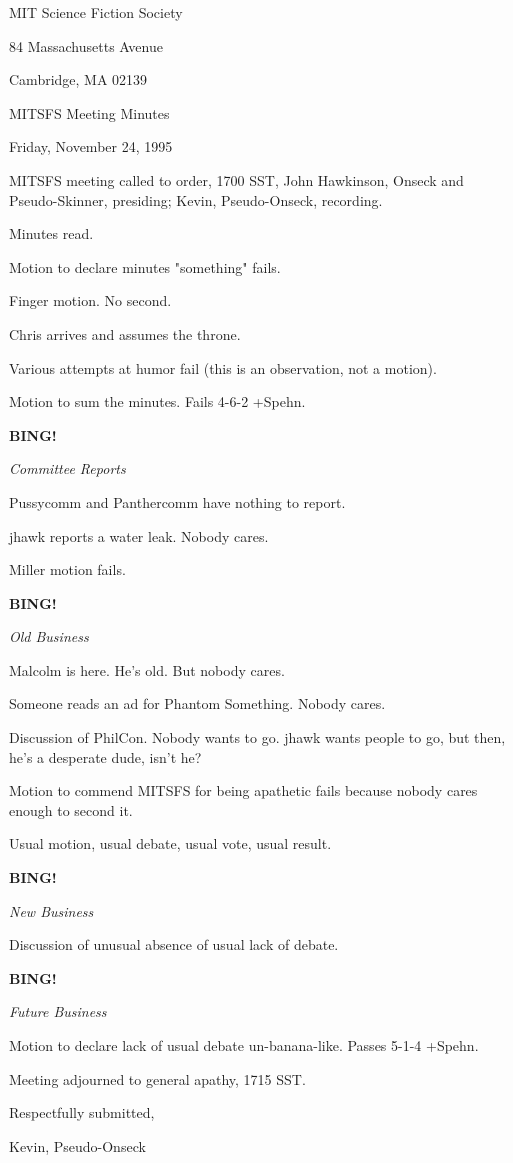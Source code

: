 \documentclass[12pt]{article}
\newcommand{\bing}{{\bf BING!} }
\newcommand{\goto}[1]{\bing \vskip 12pt \centerline{{\em{#1}}}}
\begin{document}
\begin{center}

MIT Science Fiction Society 

84 Massachusetts Avenue

Cambridge, MA 02139

\vspace{12pt}

MITSFS Meeting Minutes 

Friday, November 24, 1995

\end{center}
 
\vspace{18pt}

\setlength{\parskip}{6pt}

\noindent
MITSFS meeting called to order, 1700 SST,
John Hawkinson, Onseck and Pseudo-Skinner, presiding; Kevin, Pseudo-Onseck, recording.

Minutes read.

Motion to declare minutes "something" fails.

Finger motion. No second.

Chris arrives and assumes the throne.

Various attempts at humor fail (this is an observation, not a motion).

Motion to sum the minutes. Fails 4-6-2 +Spehn.

\goto{Committee Reports}

Pussycomm and Panthercomm have nothing to report.

jhawk reports a water leak. Nobody cares.

Miller motion fails.

\goto{Old Business}

Malcolm is here. He's old. But nobody cares.

Someone reads an ad for Phantom Something. Nobody cares.

Discussion of PhilCon. Nobody wants to go. jhawk wants people to go, but then, he's a desperate dude, isn't he?

Motion to commend MITSFS for being apathetic fails because nobody cares enough to second it.

Usual motion, usual debate, usual vote, usual result.

\goto{New Business}

Discussion of unusual absence of usual lack of debate.

\goto{Future Business}

Motion to declare lack of usual debate un-banana-like. Passes 5-1-4 +Spehn.

\vspace{12pt}

\noindent
Meeting adjourned to general apathy, 1715 SST.

\vspace{18pt}

\centerline{Respectfully submitted,}
\centerline{Kevin, Pseudo-Onseck}
\end{document}
